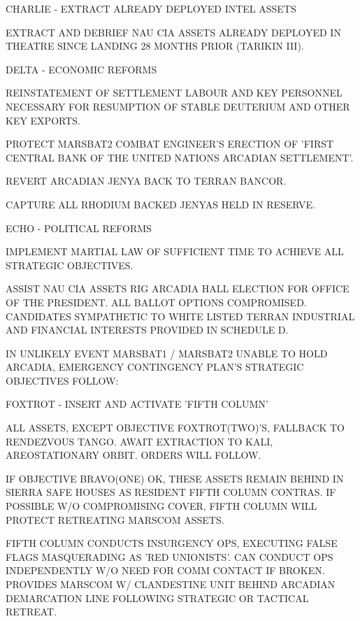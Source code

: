 \item { CHARLIE} - EXTRACT ALREADY DEPLOYED INTEL ASSETS
    \startitemize[n]
    \item EXTRACT AND DEBRIEF NAU CIA ASSETS ALREADY DEPLOYED IN THEATRE SINCE LANDING 28 MONTHS PRIOR (TARIKIN III).
    \stopitemize

\item { DELTA} - ECONOMIC REFORMS
    \startitemize[n]
    \item REINSTATEMENT OF SETTLEMENT LABOUR AND KEY PERSONNEL NECESSARY FOR RESUMPTION OF STABLE DEUTERIUM AND OTHER KEY EXPORTS.
    \item PROTECT MARSBAT2 COMBAT ENGINEER'S ERECTION OF 'FIRST CENTRAL BANK OF THE UNITED NATIONS ARCADIAN SETTLEMENT'.
    \item REVERT ARCADIAN JENYA BACK TO TERRAN BANCOR.
    \item CAPTURE ALL RHODIUM BACKED JENYAS HELD IN RESERVE.
    \stopitemize

\item { ECHO} - POLITICAL REFORMS
    \startitemize[n]
    \item IMPLEMENT MARTIAL LAW OF SUFFICIENT TIME TO ACHIEVE ALL STRATEGIC OBJECTIVES.
    \item ASSIST NAU CIA ASSETS RIG ARCADIA HALL ELECTION FOR OFFICE OF THE PRESIDENT. ALL BALLOT OPTIONS COMPROMISED. CANDIDATES SYMPATHETIC TO WHITE LISTED TERRAN INDUSTRIAL AND FINANCIAL INTERESTS PROVIDED IN SCHEDULE D.
    \stopitemize
\stopitemize

IN UNLIKELY EVENT MARSBAT1 / MARSBAT2 UNABLE TO HOLD ARCADIA, EMERGENCY CONTINGENCY PLAN'S STRATEGIC OBJECTIVES FOLLOW:
\startitemize[4]
\item { FOXTROT} - INSERT AND ACTIVATE 'FIFTH COLUMN'

    \startitemize[n]
    \item ALL ASSETS, EXCEPT OBJECTIVE FOXTROT(TWO)'S, FALLBACK TO RENDEZVOUS TANGO. AWAIT EXTRACTION TO KALI, AREOSTATIONARY ORBIT. ORDERS WILL FOLLOW.

    \item IF OBJECTIVE BRAVO(ONE) OK, THESE ASSETS REMAIN BEHIND IN SIERRA SAFE HOUSES AS RESIDENT FIFTH COLUMN CONTRAS. IF POSSIBLE W/O COMPROMISING COVER, FIFTH COLUMN WILL PROTECT RETREATING MARSCOM ASSETS.

    \item FIFTH COLUMN CONDUCTS INSURGENCY OPS, EXECUTING FALSE FLAGS MASQUERADING AS 'RED UNIONISTS'. CAN CONDUCT OPS INDEPENDENTLY W/O NEED FOR COMM CONTACT IF BROKEN. PROVIDES MARSCOM W/ CLANDESTINE UNIT BEHIND ARCADIAN DEMARCATION LINE FOLLOWING STRATEGIC OR TACTICAL RETREAT.

